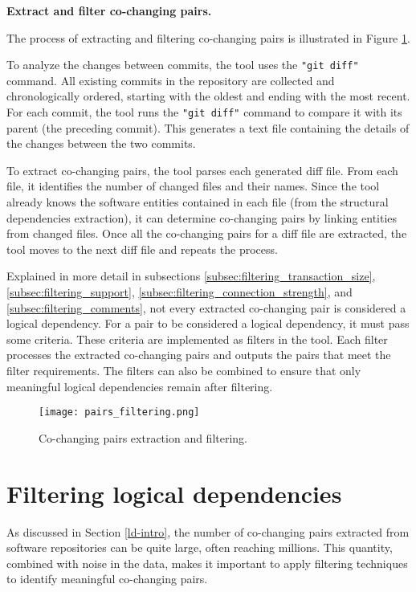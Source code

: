\textbf{Extract and filter co-changing pairs.}

The process of extracting and filtering co-changing pairs is illustrated in Figure \ref{fig:figfiltering}.

To analyze the changes between commits, the tool uses the \texttt{"git diff"} command. All existing commits in the repository are collected and chronologically ordered, starting with the oldest and ending with the most recent. For each commit, the tool runs the \texttt{"git diff"} command to compare it with its parent (the preceding commit). This generates a text file containing the details of the changes between the two commits.

To extract co-changing pairs, the tool parses each generated diff file. From each file, it identifies the number of changed files and their names. Since the tool already knows the software entities contained in each file (from the structural dependencies extraction), it can determine co-changing pairs by linking entities from changed files. Once all the co-changing pairs for a diff file are extracted, the tool moves to the next diff file and repeats the process.

Explained in more detail in subsections \ref{subsec:filtering_transaction_size}, \ref{subsec:filtering_support}, \ref{subsec:filtering_connection_strength}, and \ref{subsec:filtering_comments}, not every extracted co-changing pair is considered a logical dependency. For a pair to be considered a logical dependency, it must pass some criteria. These criteria are implemented as filters in the tool. Each filter processes the extracted co-changing pairs and outputs the pairs that meet the filter requirements. The filters can also be combined to ensure that only meaningful logical dependencies remain after filtering.

\begin{figure}[H]
\centering
\texttt{[image: pairs\_filtering.png]}
\caption{Co-changing pairs extraction and filtering.}
\label{fig:figfiltering}
\end{figure}



\section{Filtering logical dependencies}
\label{sec:filtering_logical_dependencies}

\hspace{4em}As discussed in Section \ref{ld-intro}, the number of co-changing pairs extracted from software repositories can be quite large, often reaching millions. This quantity, combined with noise in the data, makes it important to apply filtering techniques to identify meaningful co-changing pairs.

